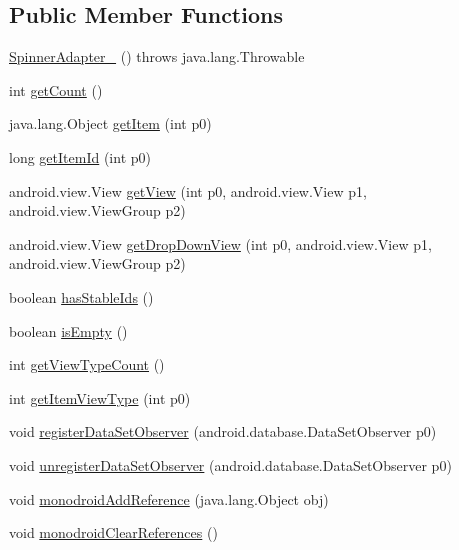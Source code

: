 \subsection*{Public Member Functions}
\begin{DoxyCompactItemize}
\item 
\hyperlink{classfieldservice_1_1android_1_1_spinner_adapter__1_a27fe7b7c220e57bb40b0ddcb1c30fbc1}{Spinner\+Adapter\+\_} ()  throws java.\+lang.\+Throwable 	
\item 
int \hyperlink{classfieldservice_1_1android_1_1_spinner_adapter__1_a4cadc13920940cfed4e1b416f3a5369c}{get\+Count} ()
\item 
java.\+lang.\+Object \hyperlink{classfieldservice_1_1android_1_1_spinner_adapter__1_afc67d302701af19b5289df7ec0bfc287}{get\+Item} (int p0)
\item 
long \hyperlink{classfieldservice_1_1android_1_1_spinner_adapter__1_acb37c7aff23a483e7b6b9ed905bdade8}{get\+Item\+Id} (int p0)
\item 
android.\+view.\+View \hyperlink{classfieldservice_1_1android_1_1_spinner_adapter__1_adac3ffb2a42267a91db4e0e637513e6f}{get\+View} (int p0, android.\+view.\+View p1, android.\+view.\+View\+Group p2)
\item 
android.\+view.\+View \hyperlink{classfieldservice_1_1android_1_1_spinner_adapter__1_a60907585e71cb518d217fb5580f76be1}{get\+Drop\+Down\+View} (int p0, android.\+view.\+View p1, android.\+view.\+View\+Group p2)
\item 
boolean \hyperlink{classfieldservice_1_1android_1_1_spinner_adapter__1_aafbeb7854d8199bbf3003bb267510d6e}{has\+Stable\+Ids} ()
\item 
boolean \hyperlink{classfieldservice_1_1android_1_1_spinner_adapter__1_ab5b8147f27050e08aece182b5d626eac}{is\+Empty} ()
\item 
int \hyperlink{classfieldservice_1_1android_1_1_spinner_adapter__1_a4ac08e682600d8a9d6a15d4236148768}{get\+View\+Type\+Count} ()
\item 
int \hyperlink{classfieldservice_1_1android_1_1_spinner_adapter__1_af41fb774c7c2a47f5868ec633a49f0d5}{get\+Item\+View\+Type} (int p0)
\item 
void \hyperlink{classfieldservice_1_1android_1_1_spinner_adapter__1_a819f6f295b4639833941da7cc9ed12d2}{register\+Data\+Set\+Observer} (android.\+database.\+Data\+Set\+Observer p0)
\item 
void \hyperlink{classfieldservice_1_1android_1_1_spinner_adapter__1_aacb74f356a384ec76afe7cfe16ca4a56}{unregister\+Data\+Set\+Observer} (android.\+database.\+Data\+Set\+Observer p0)
\item 
void \hyperlink{classfieldservice_1_1android_1_1_spinner_adapter__1_a76ce65b4cdef8ccc1a56484693235360}{monodroid\+Add\+Reference} (java.\+lang.\+Object obj)
\item 
void \hyperlink{classfieldservice_1_1android_1_1_spinner_adapter__1_aad58c1cba6010131074f970dff26873f}{monodroid\+Clear\+References} ()
\end{DoxyCompactItemize}


